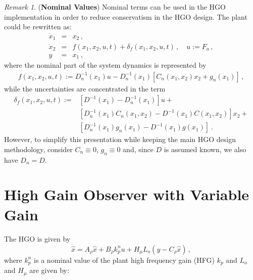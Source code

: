 \documentclass[letterpaper, 10 pt, conference]{ieeeconf}  %
\theoremstyle{plain}
\theoremstyle{definition}
\theoremstyle{remark}
\newtheorem*{remark}{Remark}
\begin{document}
 
\begin{remark}({\bf Nominal Values})
Nominal terms can be used in the HGO implementation in order to reduce conservatism in the HGO design. The plant could be rewritten as:
%
\begin{subequations}
	\begin{eqnarray}
		\dot{x}_1&=& x_2\,, \\
		\dot{x}_2 &=& f(x_1,x_2,u,t) + \delta_f(x_1,x_2,u,t)\,, \quad u:=F_a\,,\\
		y &=&  x_1\,,
	\end{eqnarray}
\end{subequations}
%
where the nominal part of the system dynamics is represented by
%
%
\begin{eqnarray}
f(x_1,x_2,u,t):=D_n^{-1}(x_1) u - D_n^{-1}(x_1) \left[ C_n(x_1,x_2) x_2+g_n(x_1)\right]\,, \nonumber
\end{eqnarray}
%
while the uncertainties are concentrated in the term 
%
\begin{equation}
	\begin{split}
		\delta_f(x_1,x_2,u,t)\!\! := \!\!&\left[D^{-1}(x_1)-D_n^{-1}(x_1)\right]  u + \\
		&\left[D_n^{-1}(x_1)C_n(x_1,x_2) - D^{-1}(x_1)C(x_1,x_2)\right] x_2 + \\
		&\left[D_n^{-1}(x_1)g_n(x_1) - D^{-1}(x_1)g(x_1)\right]\,.
	\end{split}
\end{equation}
%
However, to simplify this presentation while keeping the main HGO design methodology, consider $C_n \equiv 0$, $g_n \equiv 0$ and, since $D$ is assumed known, we also have $D_n=D$.
\end{remark}





\section{High Gain Observer with Variable Gain}
\label{sec:HGO}

The HGO \cite{Khalil2008} is given by
%
\begin{equation}
\dot{\hat{x}}=A_\rho \hat{x} +  B_\rho k_p^n u +H_\mu L_o (y-C_\rho
\hat{x})\,,\label{eq:reducedHGO}
\end{equation}
%
where $k_p^n$ is a nominal value of the plant high frequency gain (HFG) $k_p$ and $L_o$ and $H_\mu$ are given by:
\end{document}
